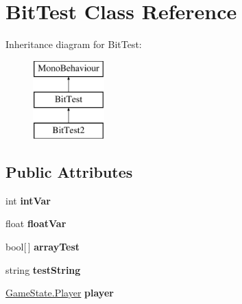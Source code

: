 \hypertarget{class_bit_test}{\section{Bit\-Test Class Reference}
\label{class_bit_test}
}
Inheritance diagram for Bit\-Test\-:\begin{figure}[H]
\begin{center}
\leavevmode
\includegraphics[height=3.000000cm]{class_bit_test}
\end{center}
\end{figure}
\subsection*{Public Attributes}
\begin{DoxyCompactItemize}
\item 
\hypertarget{class_bit_test_a229c089c4bf0f320defa8af85362ca97}{int {\bfseries int\-Var}}\label{class_bit_test_a229c089c4bf0f320defa8af85362ca97}

\item 
\hypertarget{class_bit_test_aff8f50b12ea462699b258dd4fe7da1e7}{float {\bfseries float\-Var}}\label{class_bit_test_aff8f50b12ea462699b258dd4fe7da1e7}

\item 
\hypertarget{class_bit_test_a92242e855e7f4507b804a77ae6221166}{bool\mbox{[}$\,$\mbox{]} {\bfseries array\-Test}}\label{class_bit_test_a92242e855e7f4507b804a77ae6221166}

\item 
\hypertarget{class_bit_test_afca10f624e8a1ad35b1272da122f5884}{string {\bfseries test\-String}}\label{class_bit_test_afca10f624e8a1ad35b1272da122f5884}

\item 
\hypertarget{class_bit_test_ad10d5f7bafa4471c42dff93a411c46bf}{\hyperlink{class_game_state_1_1_player}{Game\-State.\-Player} {\bfseries player}}\label{class_bit_test_ad10d5f7bafa4471c42dff93a411c46bf}

\end{DoxyCompactItemize}
